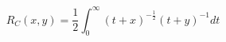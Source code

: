 \documentclass[12pt]{article}
\begin{document}
\begin{displaymath}
R_C(x, y) = \frac{1}{2} \int_{0}^{\infty} (t+x)^{-\frac{1}{2}} (t+y)^{-1} dt
\end{displaymath}
\end{document}
